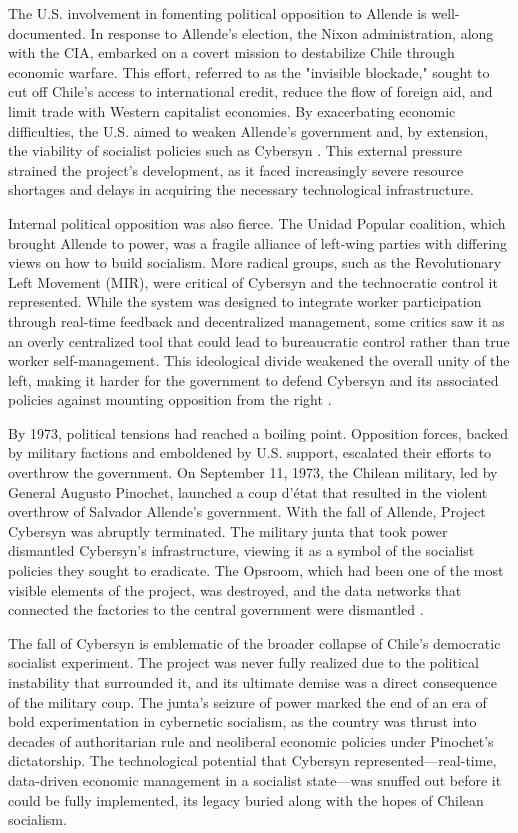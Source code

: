 \begin{refsection}
The U.S. involvement in fomenting political opposition to Allende is well-documented. In response to Allende’s election, the Nixon administration, along with the CIA, embarked on a covert mission to destabilize Chile through economic warfare. This effort, referred to as the "invisible blockade," sought to cut off Chile’s access to international credit, reduce the flow of foreign aid, and limit trade with Western capitalist economies. By exacerbating economic difficulties, the U.S. aimed to weaken Allende’s government and, by extension, the viability of socialist policies such as Cybersyn \cite[pp.~250-253]{kornbluh2016}. This external pressure strained the project’s development, as it faced increasingly severe resource shortages and delays in acquiring the necessary technological infrastructure.

Internal political opposition was also fierce. The Unidad Popular coalition, which brought Allende to power, was a fragile alliance of left-wing parties with differing views on how to build socialism. More radical groups, such as the Revolutionary Left Movement (MIR), were critical of Cybersyn and the technocratic control it represented. While the system was designed to integrate worker participation through real-time feedback and decentralized management, some critics saw it as an overly centralized tool that could lead to bureaucratic control rather than true worker self-management. This ideological divide weakened the overall unity of the left, making it harder for the government to defend Cybersyn and its associated policies against mounting opposition from the right \cite[pp.~181-183]{medina2014}.

By 1973, political tensions had reached a boiling point. Opposition forces, backed by military factions and emboldened by U.S. support, escalated their efforts to overthrow the government. On September 11, 1973, the Chilean military, led by General Augusto Pinochet, launched a coup d’état that resulted in the violent overthrow of Salvador Allende’s government. With the fall of Allende, Project Cybersyn was abruptly terminated. The military junta that took power dismantled Cybersyn’s infrastructure, viewing it as a symbol of the socialist policies they sought to eradicate. The Opsroom, which had been one of the most visible elements of the project, was destroyed, and the data networks that connected the factories to the central government were dismantled \cite[pp.~199-203]{medina2014}.

The fall of Cybersyn is emblematic of the broader collapse of Chile's democratic socialist experiment. The project was never fully realized due to the political instability that surrounded it, and its ultimate demise was a direct consequence of the military coup. The junta’s seizure of power marked the end of an era of bold experimentation in cybernetic socialism, as the country was thrust into decades of authoritarian rule and neoliberal economic policies under Pinochet’s dictatorship. The technological potential that Cybersyn represented—real-time, data-driven economic management in a socialist state—was snuffed out before it could be fully implemented, its legacy buried along with the hopes of Chilean socialism.


\end{refsection}

